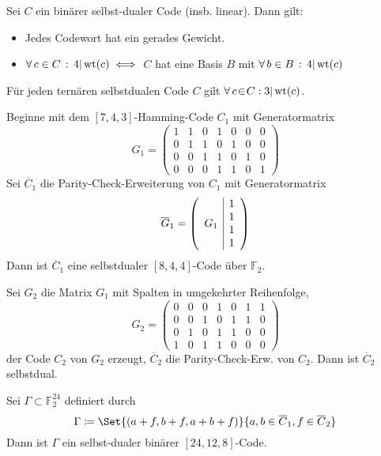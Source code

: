 \documentclass{cheat-sheet}
\newcommand{\F}{\mathbb{F}} %
\DeclareMathOperator{\wt}{wt} %
\newcommand{\divides}{|} %
\begin{document}
\begin{prop}
  Sei $C$ ein binärer selbst-dualer Code (insb. linear).
  Dann gilt:
  \begin{itemize}
    \item Jedes Codewort hat ein gerades Gewicht.
    \item $\fa{c \in C} 4 \divides \wt(c) \iff$ $C$ hat eine Basis $B$ mit $\fa{b \in B} 4 \divides \wt(c)$
  \end{itemize}
\end{prop}

\begin{prop}
  Für jeden ternären selbstdualen Code $C$ gilt $\fa{c \!\in\! C\!}\! 3 \divides \wt(c)$.
\end{prop}

\begin{konstr}
  Beginne mit dem $[7, 4, 3]$-Hamming-Code $C_1$ mit Generatormatrix
  \[
    G_1 = \begin{pmatrix}
      1 & 1 & 0 & 1 & 0 & 0 & 0 \\
      0 & 1 & 1 & 0 & 1 & 0 & 0 \\
      0 & 0 & 1 & 1 & 0 & 1 & 0 \\
      0 & 0 & 0 & 1 & 1 & 0 & 1
    \end{pmatrix}
  \]
  Sei $\overline{C}_1$ die Parity-Check-Erweiterung von $C_1$ mit Generatormatrix
  \[
    \overline{G}_1 = \left( \begin{array}{c | c}
      \multirow{4}{*}{$G_1$} & 1 \\
      & 1 \\
      & 1 \\
      & 1
    \end{array} \right)
  \]
  Dann ist $\overline{C}_1$ eine selbstdualer $[8,4,4]$-Code über $\F_2$.
  
  Sei $G_2$ die Matrix $G_1$ mit Spalten in umgekehrter Reihenfolge,
  \[
    G_2 = \begin{pmatrix}
      0 & 0 & 0 & 1 & 0 & 1 & 1 \\
      0 & 0 & 1 & 0 & 1 & 1 & 0 \\
      0 & 1 & 0 & 1 & 1 & 0 & 0 \\
      1 & 0 & 1 & 1 & 0 & 0 & 0
    \end{pmatrix}
  \]
  der Code $C_2$ von $G_2$ erzeugt, $\overline{C}_2$ die Parity-Check-Erw. von $C_2$.
  Dann ist $\overline{C}_2$ selbstdual.
\end{konstr}

\begin{satz}
  Sei $\Gamma \subset \F_2^{24}$ definiert durch
  \[ \Gamma \coloneqq \Set{(a+f, b+f, a+b+f)}{a, b \in \overline{C}_1, f \in \overline{C}_2} \]
  Dann ist $\Gamma$ ein selbst-dualer binärer $[24, 12, 8]$-Code.
\end{satz}
\end{document}
